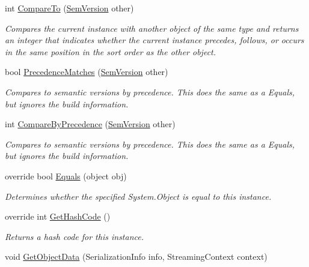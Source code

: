 \begin{DoxyCompactItemize}
int \mbox{\hyperlink{class_semver_1_1_sem_version_ad72682b72071f1a8fef88c7a978db04c}{Compare\+To}} (\mbox{\hyperlink{class_semver_1_1_sem_version}{Sem\+Version}} other)
\begin{DoxyCompactList}\small\item\em Compares the current instance with another object of the same type and returns an integer that indicates whether the current instance precedes, follows, or occurs in the same position in the sort order as the other object. \end{DoxyCompactList}\item 
bool \mbox{\hyperlink{class_semver_1_1_sem_version_a8a4c9fdc124a640e26a9d81e6b6ea257}{Precedence\+Matches}} (\mbox{\hyperlink{class_semver_1_1_sem_version}{Sem\+Version}} other)
\begin{DoxyCompactList}\small\item\em Compares to semantic versions by precedence. This does the same as a Equals, but ignores the build information. \end{DoxyCompactList}\item 
int \mbox{\hyperlink{class_semver_1_1_sem_version_adabe1c3ea77ec1dae140cdc3aa4c60b1}{Compare\+By\+Precedence}} (\mbox{\hyperlink{class_semver_1_1_sem_version}{Sem\+Version}} other)
\begin{DoxyCompactList}\small\item\em Compares to semantic versions by precedence. This does the same as a Equals, but ignores the build information. \end{DoxyCompactList}\item 
override bool \mbox{\hyperlink{class_semver_1_1_sem_version_a32a7224158056561d19ee7b2973f4ce1}{Equals}} (object obj)
\begin{DoxyCompactList}\small\item\em Determines whether the specified System.\+Object is equal to this instance. \end{DoxyCompactList}\item 
override int \mbox{\hyperlink{class_semver_1_1_sem_version_ac570f6109ec0a58cbe5127b7505c654d}{Get\+Hash\+Code}} ()
\begin{DoxyCompactList}\small\item\em Returns a hash code for this instance. \end{DoxyCompactList}\item 
void \mbox{\hyperlink{class_semver_1_1_sem_version_ab7a3c2f630b6220ecb7c05c21aea9eb5}{Get\+Object\+Data}} (Serialization\+Info info, Streaming\+Context context)
\end{DoxyCompactItemize}

